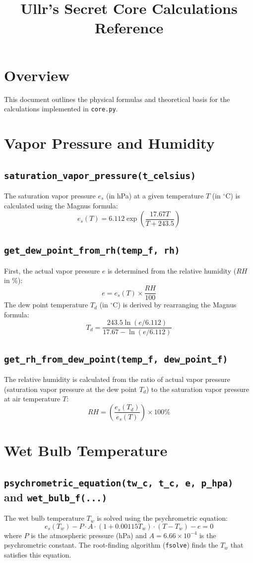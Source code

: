 \documentclass[11pt]{article}
\title{Ullr's Secret Core Calculations Reference}
\author{}
\date{}
\begin{document}
\maketitle

\section*{Overview}
This document outlines the physical formulas and theoretical basis for the calculations implemented in \texttt{core.py}.

\section{Vapor Pressure and Humidity}
\subsection{\texttt{saturation\_vapor\_pressure(t\_celsius)}}
The saturation vapor pressure $e_s$ (in hPa) at a given temperature $T$ (in $^\circ\text{C}$) is calculated using the Magnus formula:
\[
e_s(T) = 6.112 \exp\left(\frac{17.67 T}{T + 243.5}\right)
\]

\subsection{\texttt{get\_dew\_point\_from\_rh(temp\_f, rh)}}
First, the actual vapor pressure $e$ is determined from the relative humidity ($RH$ in \%):
\[
e = e_s(T) \times \frac{RH}{100}
\]
The dew point temperature $T_d$ (in $^\circ\text{C}$) is derived by rearranging the Magnus formula:
\[
T_d = \frac{243.5 \ln(e / 6.112)}{17.67 - \ln(e / 6.112)}
\]

\subsection{\texttt{get\_rh\_from\_dew\_point(temp\_f, dew\_point\_f)}}
The relative humidity is calculated from the ratio of actual vapor pressure (saturation vapor pressure at the dew point $T_d$) to the saturation vapor pressure at air temperature $T$:
\[
RH = \left( \frac{e_s(T_d)}{e_s(T)} \right) \times 100\%
\]

\section{Wet Bulb Temperature}
\subsection{\texttt{psychrometric\_equation(tw\_c, t\_c, e, p\_hpa)} and \texttt{wet\_bulb\_f(...)}}
The wet bulb temperature $T_w$ is solved using the psychrometric equation:
\[
e_s(T_w) - P \cdot A \cdot (1 + 0.00115 T_w) \cdot (T - T_w) - e = 0
\]
where $P$ is the atmospheric pressure (hPa) and $A = 6.66 \times 10^{-4}$ is the psychrometric constant. The root-finding algorithm (\texttt{fsolve}) finds the $T_w$ that satisfies this equation.
\end{document}
